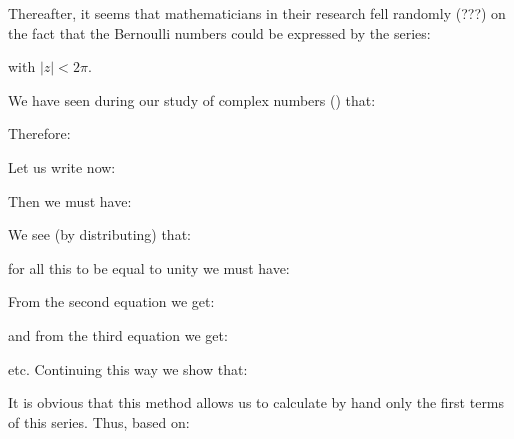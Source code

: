 	\begin{theorem}
	Thereafter, it seems that mathematicians in their research fell randomly (???) on the fact that the Bernoulli numbers could be expressed by the series:
	
	with $\vert z\vert<2\pi$.
	\end{theorem}
	\begin{dem}
	We have seen during our study of complex numbers () that:
		
		Therefore:
		
		Let us write now:
		
		Then we must have:
		
		We see (by distributing) that:
		
		for all this to be equal to unity we must have:
		
		From the second equation we get:
		
		and from the third equation we get:
		
		etc. Continuing this way we show that:
		
		It is obvious that this method allows us to calculate by hand only the first terms of this series.
		Thus, based on:
		

\end{dem}
